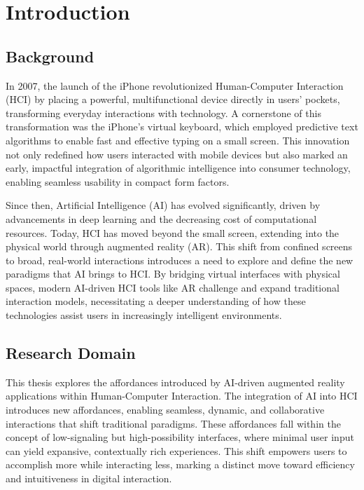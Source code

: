 
\section{Introduction}

\subsection{Background}

In 2007, the launch of the iPhone revolutionized Human-Computer Interaction (HCI) by placing a powerful, multifunctional device directly in users' pockets, transforming everyday interactions with technology.
A cornerstone of this transformation was the iPhone's virtual keyboard, which employed predictive text algorithms to enable fast and effective typing on a small screen.
This innovation not only redefined how users interacted with mobile devices but also marked an early, impactful integration of algorithmic intelligence into consumer technology, enabling seamless usability in compact form factors.

Since then, Artificial Intelligence (AI) has evolved significantly, driven by advancements in deep learning and the decreasing cost of computational resources.
Today, HCI has moved beyond the small screen, extending into the physical world through augmented reality (AR).
This shift from confined screens to broad, real-world interactions introduces a need to explore and define the new paradigms that AI brings to HCI.
By bridging virtual interfaces with physical spaces, modern AI-driven HCI tools like AR challenge and expand traditional interaction models, necessitating a deeper understanding of how these technologies assist users in increasingly intelligent environments.

\subsection{Research Domain}
This thesis explores the affordances introduced by AI-driven augmented reality applications within Human-Computer Interaction.
The integration of AI into HCI introduces new affordances, enabling seamless, dynamic, and collaborative interactions that shift traditional paradigms.
These affordances fall within the concept of low-signaling but high-possibility interfaces, where minimal user input can yield expansive, contextually rich experiences.
This shift empowers users to accomplish more while interacting less, marking a distinct move toward efficiency and intuitiveness in digital interaction.

